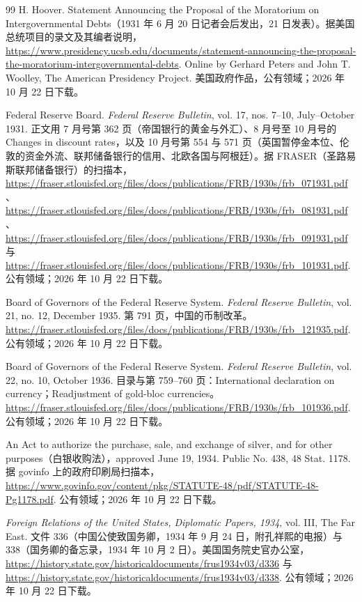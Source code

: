 \begin{thebibliography}{99}
 H. Hoover. Statement Announcing the Proposal of the Moratorium on Intergovernmental Debts（1931 年 6 月 20 日记者会后发出，21 日发表）。据美国总统项目的录文及其编者说明，\url{https://www.presidency.ucsb.edu/documents/statement-announcing-the-proposal-the-moratorium-intergovernmental-debts}. Online by Gerhard Peters and John T. Woolley, The American Presidency Project. 美国政府作品，公有领域；2026 年 10 月 22 日下载。

 Federal Reserve Board. \emph{Federal Reserve Bulletin}, vol. 17, nos. 7--10, July--October 1931. 正文用 7 月号第 362 页（帝国银行的黄金与外汇）、8 月号至 10 月号的 Changes in discount rates，以及 10 月号第 554 与 571 页（英国暂停金本位、伦敦的资金外流、联邦储备银行的信用、北欧各国与阿根廷）。据 FRASER（圣路易斯联邦储备银行）的扫描本，\url{https://fraser.stlouisfed.org/files/docs/publications/FRB/1930s/frb_071931.pdf}、\url{https://fraser.stlouisfed.org/files/docs/publications/FRB/1930s/frb_081931.pdf}、\url{https://fraser.stlouisfed.org/files/docs/publications/FRB/1930s/frb_091931.pdf} 与 \url{https://fraser.stlouisfed.org/files/docs/publications/FRB/1930s/frb_101931.pdf}. 公有领域；2026 年 10 月 22 日下载。

 Board of Governors of the Federal Reserve System. \emph{Federal Reserve Bulletin}, vol. 21, no. 12, December 1935. 第 791 页，中国的币制改革。\url{https://fraser.stlouisfed.org/files/docs/publications/FRB/1930s/frb_121935.pdf}. 公有领域；2026 年 10 月 22 日下载。

 Board of Governors of the Federal Reserve System. \emph{Federal Reserve Bulletin}, vol. 22, no. 10, October 1936. 目录与第 759--760 页：International declaration on currency；Readjustment of gold-bloc currencies。\url{https://fraser.stlouisfed.org/files/docs/publications/FRB/1930s/frb_101936.pdf}. 公有领域；2026 年 10 月 22 日下载。

 An Act to authorize the purchase, sale, and exchange of silver, and for other purposes（白银收购法），approved June 19, 1934. Public No. 438, 48 Stat. 1178. 据 govinfo 上的政府印刷局扫描本，\url{https://www.govinfo.gov/content/pkg/STATUTE-48/pdf/STATUTE-48-Pg1178.pdf}. 公有领域；2026 年 10 月 22 日下载。

 \emph{Foreign Relations of the United States, Diplomatic Papers, 1934}, vol. III, The Far East. 文件 336（中国公使致国务卿，1934 年 9 月 24 日，附孔祥熙的电报）与 338（国务卿的备忘录，1934 年 10 月 2 日）。美国国务院史官办公室，\url{https://history.state.gov/historicaldocuments/frus1934v03/d336} 与 \url{https://history.state.gov/historicaldocuments/frus1934v03/d338}. 公有领域；2026 年 10 月 22 日下载。


\end{thebibliography}
